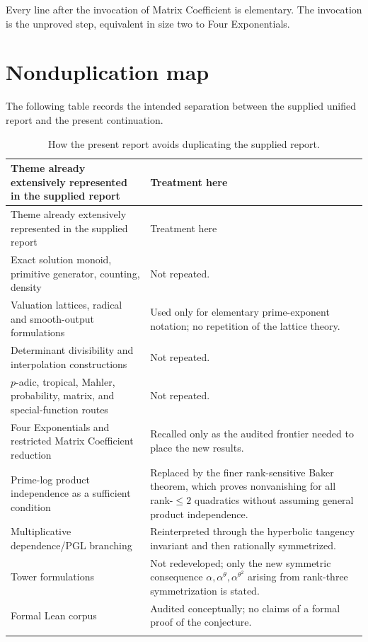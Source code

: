 \documentclass[11pt]{article}
\theoremstyle{definition}
\theoremstyle{remark}
\begin{document}
Every line after the invocation of Matrix Coefficient is elementary.  The invocation is the
unproved step, equivalent in size two to Four Exponentials.

\section{Nonduplication map}
\label{app:nonduplication}

The following table records the intended separation between the supplied unified report and
the present continuation.

\begin{longtable}{@{}>{\raggedright\arraybackslash}p{}>{\raggedright\arraybackslash}p{}@{}}
\toprule
Theme already extensively represented in the supplied report & Treatment here \\
\midrule
\endfirsthead
\toprule
Theme already extensively represented in the supplied report & Treatment here \\
\midrule
\endhead
Exact solution monoid, primitive generator, counting, density & Not repeated. \\
Valuation lattices, radical and smooth-output formulations & Used only for elementary prime-exponent notation; no repetition of the lattice theory. \\
Determinant divisibility and interpolation constructions & Not repeated. \\
$p$-adic, tropical, Mahler, probability, matrix, and special-function routes & Not repeated. \\
Four Exponentials and restricted Matrix Coefficient reduction & Recalled only as the audited frontier needed to place the new results. \\
Prime-log product independence as a sufficient condition & Replaced by the finer rank-sensitive Baker theorem, which proves nonvanishing for all rank-$\le2$ quadratics without assuming general product independence. \\
Multiplicative dependence/PGL branching & Reinterpreted through the hyperbolic tangency invariant and then rationally symmetrized. \\
Tower formulations & Not redeveloped; only the new symmetric consequence $\alpha,\alpha^\theta,\alpha^{\theta^2}$ arising from rank-three symmetrization is stated. \\
Formal Lean corpus & Audited conceptually; no claims of a formal proof of the conjecture. \\
\bottomrule
\caption{How the present report avoids duplicating the supplied report.}
\end{longtable}
\end{document}
